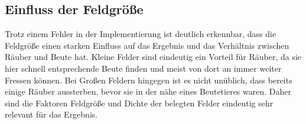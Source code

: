 \documentclass[]{scrartcl}
\begin{document}
\subsection{Einfluss der Feldgröße}
Trotz einem Fehler in der Implementierung ist deutlich erkennbar, dass die Feldgröße einen starken Einfluss auf das Ergebnis und das Verhältnis zwischen Räuber und Beute hat. Kleine Felder sind eindeutig ein Vorteil für Räuber, da sie hier schnell entsprechende Beute finden und meist von dort an immer weiter Fressen können. Bei Großen Feldern hingegen ist es nicht unüblich, dass bereits einige Räuber aussterben, bevor sie in der nähe eines Beutetieres waren. Daher sind die Faktoren Feldgröße und Dichte der belegten Felder eindeutig sehr relevant für das Ergebnis.
\end{document}
